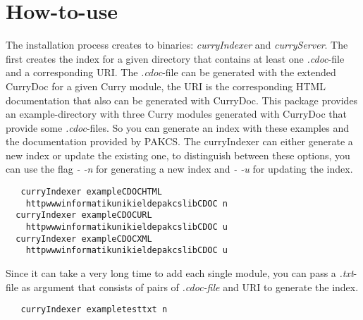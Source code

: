 \documentclass[%
	latex,%
	a4paper,%
	oneside,%
	chapterprefix,%
	headsepline,%
	12pt%
]{scrbook}
\begin{document}
\section{How-to-use}

The installation process creates to binaries: \emph{curryIndexer} and
\emph{curryServer}. %
The first creates the index for a given directory that contains at
least one \emph{.cdoc}-file and a corresponding URI. %
The \emph{.cdoc}-file can be generated with the extended CurryDoc for
a given Curry module, the URI is the corresponding HTML documentation
that also can be generated with CurryDoc. %
This package provides an example-directory with three Curry modules
generated with CurryDoc that provide some \emph{.cdoc}-files. %
So you can generate an index with these examples and the documentation
provided by PAKCS. %
The curryIndexer can either generate a new index or update the
existing one, to distinguish between these options, you can use the
flag \emph{- -n} for generating a new index and \emph{- -u} for
updating the index.

\begin{tabbing}\tt
~~curryIndexer~exampleCDOCHTML~\\
\tt ~~~~httpwwwinformatikunikieldepakcslibCDOC~n\\
\tt ~~curryIndexer~exampleCDOCURL~\\
\tt ~~~~httpwwwinformatikunikieldepakcslibCDOC~u\\
\tt ~~curryIndexer~exampleCDOCXML~\\
\tt ~~~~httpwwwinformatikunikieldepakcslibCDOC~u
\end{tabbing}

Since it can take a very long time to add each single module, you can
pass a \emph{.txt}-file as argument that consists of pairs of \emph{.cdoc-file} and
URI to generate the index.

\begin{tabbing}\tt
~~curryIndexer~exampletesttxt~n
\end{tabbing}
\end{document}
